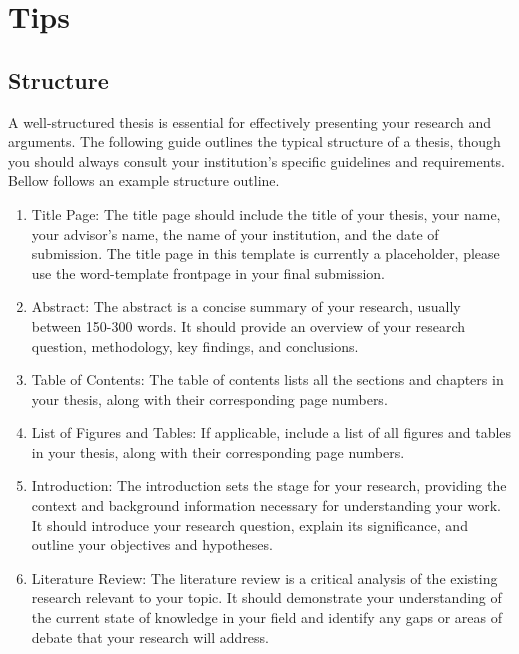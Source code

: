 \section{Tips}

\subsection{Structure}

A well-structured thesis is essential for effectively presenting your research and arguments. The following guide outlines the typical structure of a thesis, though you should always consult your institution's specific guidelines and requirements. Bellow follows an example structure outline.

\begin{enumerate}

    \item Title Page: The title page should include the title of your thesis, your name, your advisor's name, the name of your institution, and the date of submission. The title page in this template is currently a placeholder, please use the word-template frontpage in your final submission. 

    \item Abstract: The abstract is a concise summary of your research, usually between 150-300 words. It should provide an overview of your research question, methodology, key findings, and conclusions.

    \item Table of Contents: The table of contents lists all the sections and chapters in your thesis, along with their corresponding page numbers.

    \item List of Figures and Tables: If applicable, include a list of all figures and tables in your thesis, along with their corresponding page numbers.

    \item Introduction: The introduction sets the stage for your research, providing the context and background information necessary for understanding your work. It should introduce your research question, explain its significance, and outline your objectives and hypotheses.

    \item Literature Review: The literature review is a critical analysis of the existing research relevant to your topic. It should demonstrate your understanding of the current state of knowledge in your field and identify any gaps or areas of debate that your research will address.


\end{enumerate}
